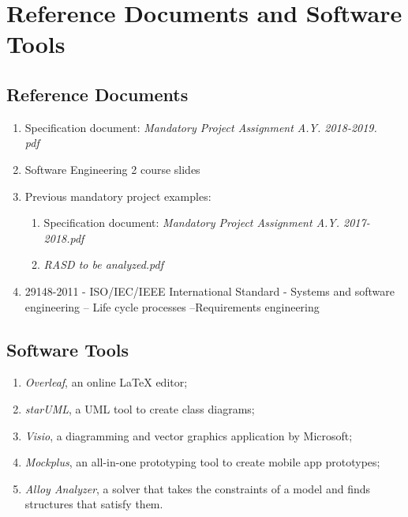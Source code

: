 \section{Reference Documents and Software Tools}

    \subsection{Reference Documents}
        \begin{enumerate}
            \item Specification document: \textit{Mandatory Project Assignment A.Y. 2018-2019.\\pdf}
            
            \item Software Engineering 2 course slides
            
            \item Previous mandatory project examples: 
                \begin{enumerate}
                    \item Specification document: \textit{Mandatory Project Assignment A.Y. 2017-2018.pdf}
                    
                    \item \textit{RASD to be analyzed.pdf}
                \end{enumerate}
                
            \item 29148-2011 - ISO/IEC/IEEE International Standard - Systems and software engineering -- Life cycle processes --Requirements engineering
        \end{enumerate}
        
    \subsection{Software Tools}
    
        \begin{enumerate}
            \item \emph{Overleaf}, an online LaTeX editor;
            \item \emph{starUML},  a UML tool to create class diagrams;
            \item \emph{Visio}, a diagramming and vector graphics application by Microsoft;
            \item \emph{Mockplus}, an all-in-one prototyping tool to create mobile app prototypes;
            \item \emph{Alloy Analyzer}, a solver that takes the constraints of a model and finds structures that satisfy them.
        \end{enumerate}